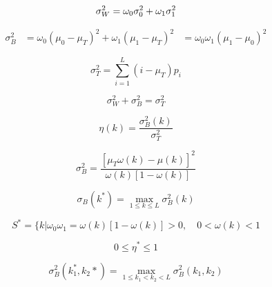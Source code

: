\documentclass{article}
\begin{document}
\begin{equation}
  \label{eq:13}
  \sigma_W^2 = \omega_0\sigma_0^2+\omega_1\sigma_1^2\\
\end{equation}

\begin{equation}
  \label{eq:14}
  \begin{aligned}
    \sigma_B^2 &= \omega_0(\mu_0-\mu_T)^2+\omega_1(\mu_1-\mu_T)^2
    &= \omega_0\omega_1(\mu_1-\mu_0)^2
  \end{aligned}
\end{equation}

\begin{equation}
  \label{eq:15}
  \sigma_T^2=\sum_{i=1}^L(i-\mu_T)p_i
\end{equation}

\begin{equation}
  \label{eq:16}
  \sigma_W^2+\sigma_B^2=\sigma_T^2
\end{equation}

\begin{equation}
  \label{eq:17}
  \eta(k)=\frac{\sigma_B^2(k)}{\sigma_T^2}
\end{equation}

\begin{equation}
  \label{eq:18}
  \sigma_B^2=\frac{[\mu_T\omega(k)-\mu(k)]^2}{\omega(k)[1-\omega(k)]}
\end{equation}

\begin{equation}
  \label{eq:19}
  \sigma_B(k^*)=\max_{1\leqslant k\leqslant L}\sigma_B^2(k)
\end{equation}

\begin{equation*}
  S^*=\{k|\omega_0\omega_1=\omega(k)[1-\omega(k)]>0,\quad
  0<\omega(k)<1
\end{equation*}

\begin{equation*}
  0\leqslant\eta^*\leqslant 1
\end{equation*}

\begin{equation*}
  \sigma_B^2(k_1^*,k_2*)=\max_{1\leqslant k_1<k_2<L}\sigma_B^2(k_1,k_2)
\end{equation*}
\end{document}
